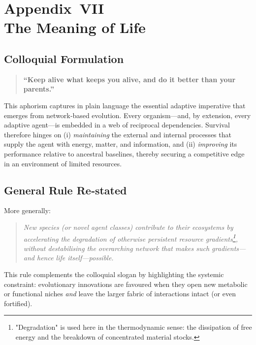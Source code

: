 \chapter*{Appendix VII\\The Meaning of Life}

\section*{Colloquial Formulation}
\begin{quote}
\textbf{“Keep alive what keeps you alive, and do it better than your parents.”}
\end{quote}
This aphorism captures in plain language the essential adaptive imperative that emerges from network‑based evolution.  Every organism---and, by extension, every adaptive agent---is embedded in a web of reciprocal dependencies.  Survival therefore hinges on (i) \emph{maintaining} the external and internal processes that supply the agent with energy, matter, and information, and (ii) \emph{improving} its performance relative to ancestral baselines, thereby securing a competitive edge in an environment of limited resources.

\section*{General Rule Re‑stated}
More generally:
\begin{quote}
\textit{New species (or novel agent classes) contribute to their ecosystems by accelerating the degradation of otherwise persistent resource gradients\footnote{"Degradation" is used here in the thermodynamic sense: the dissipation of free energy and the breakdown of concentrated material stocks.}, without destabilising the overarching network that makes such gradients---and hence life itself---possible.}
\end{quote}
This rule complements the colloquial slogan by highlighting the systemic constraint: evolutionary innovations are favoured when they open new metabolic or functional niches \emph{and} leave the larger fabric of interactions intact (or even fortified).

